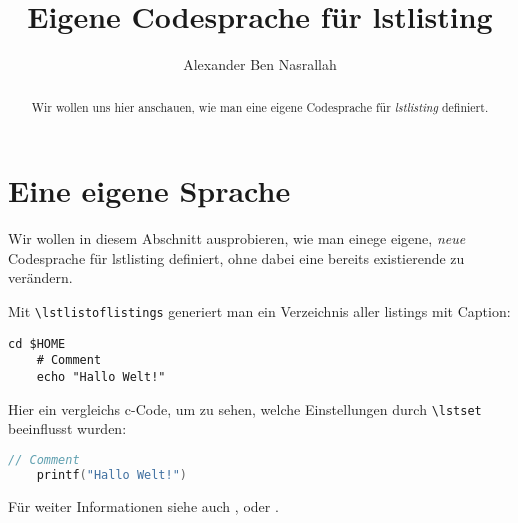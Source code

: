 \documentclass[a4paper]{article}
\title{Eigene Codesprache für lstlisting}
\author{Alexander Ben Nasrallah}
\begin{document}
\maketitle
\begin{abstract}
	Wir wollen uns hier anschauen, wie man eine eigene Codesprache für
	\emph{lstlisting} definiert.
\end{abstract}

\section{Eine eigene Sprache}
Wir wollen in diesem Abschnitt ausprobieren, wie man einege eigene, \emph{neue}
Codesprache für lstlisting definiert, ohne dabei eine bereits existierende zu
verändern.

Mit \verb+\lstlistoflistings+ generiert man ein Verzeichnis aller listings mit
Caption:
\lstlistoflistings

\begin{lstlisting}[language=cli, title=Titel, caption={Command line}]
	cd $HOME
	# Comment
	echo "Hallo Welt!"
\end{lstlisting}

Hier ein vergleichs c-Code, um zu sehen, welche Einstellungen durch
\verb+\lstset+ beeinflusst wurden:
\begin{lstlisting}[language=C, caption={c-Code mit Standardeinstellungen}]
	// Comment
	printf("Hallo Welt!")
\end{lstlisting}

Für weiter Informationen siehe auch \cite{ctanListings}, \cite{wikiListings} oder \cite{manListings}.

\printbibliography
\end{document}
